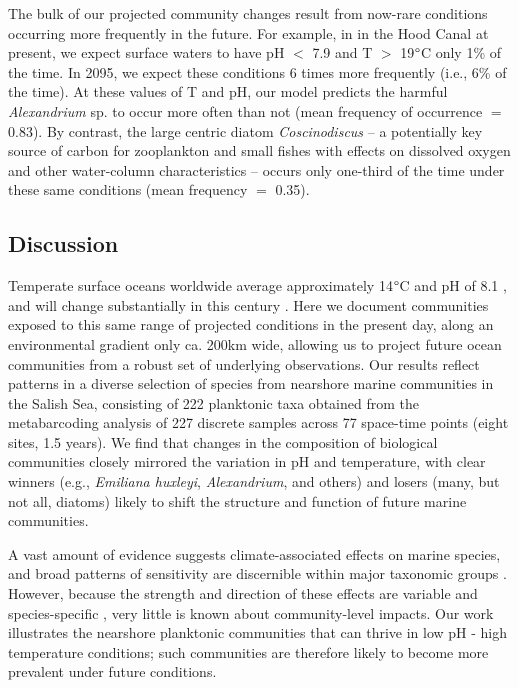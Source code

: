 \documentclass[11pt]{article}
\begin{document}
\begin{linenumbers}
{\color{blue}The bulk of our projected community changes result from now-rare conditions occurring more frequently in the future. For example, in in the Hood Canal at present, we expect surface waters to have pH $<$ 7.9 and T $>$ 19$\degree$C only 1\% of the time. In 2095, we expect these conditions 6 times more frequently (i.e., 6\% of the time). At these values of T and pH, our model predicts the harmful \textit{Alexandrium} sp. to occur more often than not (mean frequency of occurrence $=$ 0.83). By contrast, the large centric diatom \textit{Coscinodiscus} -- a potentially key source of carbon for zooplankton and small fishes \cite{pasquaud2010determination, zamon2002tidal} with effects on dissolved oxygen and other water-column characteristics \cite{manabe1991bloom} -- occurs only one-third of the time under these same conditions (mean frequency $=$ 0.35).}

\subsection*{Discussion}

Temperate surface oceans worldwide average approximately 14$\degree$C and pH of 8.1 \cite{bopp2013multiple}, and will change substantially in this century \citep[mean $\Delta$ T 2.5$\degree$C, $\Delta$ pH -0.35 globally; RCP 8.5;][]{gattuso2015contrasting}.  Here we document communities exposed to this same range of projected conditions in the present day, along an environmental gradient only ca. 200km wide, allowing us to project future ocean communities from a robust set of underlying observations. Our results reflect patterns in a diverse selection of species from nearshore marine communities in the Salish Sea, consisting of 222 planktonic taxa obtained from the metabarcoding analysis of 227 discrete samples across 77 space-time points (eight sites, 1.5 years). We find that changes in the composition of biological communities closely mirrored the variation in pH and temperature, with clear winners (e.g., \textit{Emiliana huxleyi}, \textit{Alexandrium}, and others) and losers (many, but not all, diatoms) likely to shift the structure and function of future marine communities.

A vast amount of evidence suggests climate-associated effects on marine species, and broad patterns of sensitivity are discernible within major taxonomic groups  \citep[][among many others]{gattuso2015contrasting, stock2017reconciling}. However, because the strength and direction of these effects are variable and species-specific \cite{kroeker2013impacts}, very little is known about community-level impacts. Our work illustrates the nearshore planktonic communities that can thrive in low pH - high temperature conditions; such communities are therefore likely to become more prevalent under future conditions. 


\end{linenumbers}
\end{document}
